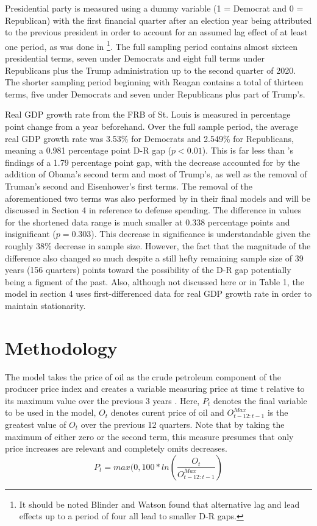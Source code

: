 \documentclass[a4paper, 12pt]{article}
\begin{document}
Presidential party is measured using a dummy variable (1 = Democrat and 0 = Republican) with the first financial quarter after an election year being attributed to the previous president in order to account for an assumed lag effect of at least one period, as was done in \footnote{It should be noted Blinder and Watson found that alternative lag and lead effects up to a period of four all lead to smaller D-R gaps.}. The full sampling period contains almost sixteen presidential terms, seven under Democrats and eight full terms under Republicans plus the Trump administration up to the second quarter of 2020. The shorter sampling period beginning with Reagan contains a total of thirteen terms, five under Democrats and seven under Republicans plus part of Trump's. \par

Real GDP growth rate from the FRB of St. Louis is measured in percentage point change from a year beforehand. Over the full sample period, the average real GDP growth rate was 3.53\% for Democrats and 2.549\% for Republicans, meaning a 0.981 percentage point D-R gap ($p < 0.01$). This is far less than \citeauthor{blinderwatson2016}’s findings of a 1.79 percentage point gap, with the decrease accounted for by the addition of Obama’s second term and most of Trump’s, as well as the removal of Truman’s second and Eisenhower’s first terms. The removal of the aforementioned two terms was also performed by \citeauthor{blinderwatson2016} in their final models and will be discussed in Section 4 in reference to defense spending. The difference in values for the shortened data range is much smaller at 0.338 percentage points and insignificant ($p = 0.303$). This decrease in significance is understandable given the roughly 38\% decrease in sample size. However, the fact that the magnitude of the difference also changed so much despite a still hefty remaining sample size of 39 years (156 quarters) points toward the possibility of the D-R gap potentially being a figment of the past. Also, although not discussed here or in Table 1, the model in section 4 uses first-differenced data for real GDP growth rate in order to maintain stationarity.


\section{Methodology}
The model takes the price of oil as the crude petroleum component of the producer price index and creates a variable measuring price at time t relative to its maximum value over the previous 3 years \cite{hamilton2003}. Here, $P_t$ denotes the final variable to be used in the model, $O_t$ denotes curent price of oil and $O_{t-12:t-1}^{Max}$ is the greatest value of $O_t$ over the previous 12 quarters. Note that by taking the maximum of either zero or the second term, this measure presumes that only price increases are relevant and completely omits decreases.
\[P_t = max(0, 100*ln(\frac{O_t}{O_{t-12:t-1}^{Max}})\]
\end{document}

